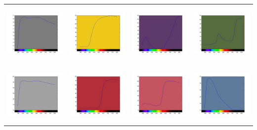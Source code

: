 \documentclass{amsart}
\theoremstyle{definition}
\theoremstyle{remark}
\numberwithin{equation}{section}
\begin{document}
\begin{tabular}{  c c c c }
\includegraphics[width=3.0cm,height=3.0cm]{ch9.jpg}
&
\includegraphics[width=3.0cm,height=3.0cm]{ch10.jpg}
&
\includegraphics[width=3.0cm,height=3.0cm]{ch11.jpg}
&
\includegraphics[width=3.0cm,height=3.0cm]{ch12.jpg}
\\

\includegraphics[width=3.0cm,height=3.0cm]{ch13.jpg}
&
\includegraphics[width=3.0cm,height=3.0cm]{ch14.jpg}
&
\includegraphics[width=3.0cm,height=3.0cm]{ch15.jpg}
&
\includegraphics[width=3.0cm,height=3.0cm]{ch16.jpg}
\\


\end{tabular}
\end{document}
